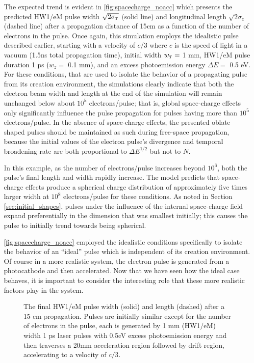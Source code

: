The expected trend is evident in \ref{fig:spacecharge_noacc} which presents the predicted HW1/eM pulse width $\sqrt{2 \sigma_{\smallT}}$ (solid line) and longitudinal length $\sqrt{2 \sigma_{z}}$ (dashed line) after a propagation distance of 15cm as a function of the number of electrons in the pulse.
Once again, this simulation employs the idealistic pulse described earlier, starting with a velocity of $c/3$ where $c$ is the speed of light in a vacuum (1.5ns total propagation time), initial width $w_{\smallT} = $ 1 mm, HW1/eM pulse duration 1 ps ($w_{z} = $ 0.1 mm), and an excess photoemission energy $\Delta E = $ 0.5 eV.
For these conditions, that are used to isolate the behavior of a propagating pulse from its creation environment, the simulations clearly indicate that both the electron beam width and length at the end of the simulation will remain unchanged below about $10^5$ electrons/pulse; that is, global space-charge effects only significantly influence the pulse propagation for pulses having more than $10^5$ electrons/pulse.
In the absence of space-charge effects, the presented oblate shaped pulses should be maintained as such during free-space propagation, because the initial values of the electron pulse's divergence and temporal broadening rate are both proportional to $\Delta E^{1/2}$ but not to $N$.

In this example, as the number of electrons/pulse increases beyond $10^6$, both the pulse's final length and width rapidly increase.
The model predicts that space-charge effects produce a spherical charge distribution of approximately five times larger width at $10^8$ electrons/pulse for these conditions.
As noted in Section \ref{sec:initial_shapes}, pulses under the influence of the internal space-charge field expand preferentially in the dimension that was smallest initially; this causes the pulse to initially trend towards being spherical.

\ref{fig:spacecharge_noacc} employed the idealistic conditions specifically to isolate the behavior of an ``ideal'' pulse which is independent of its creation environment.
Of course in a more realistic system, the electron pulse is generated from a photocathode and then accelerated.
Now that we have seen how the ideal case behaves, it is important to consider the interesting role that these more realistic factors play in the system.

\begin{figure}
  \centering
  \begin{tikzpicture}
    
  \end{tikzpicture}
  \caption[More realistic free-space pulse evolution vs charge density]{
    The final HW1/eM pulse width (solid) and length (dashed) after a 15 cm propagation. 
    Pulses are initially similar except for the number of electrons in the pulse, each is generated by 1 mm (HW1/eM) width 1 ps laser pulses with 0.5eV excess photoemission energy and then traverses a 20mm acceleration region followed by drift region, accelerating to a velocity of $c/3$.
  }
  \label{fig:spacecharge_acc}
\end{figure}

